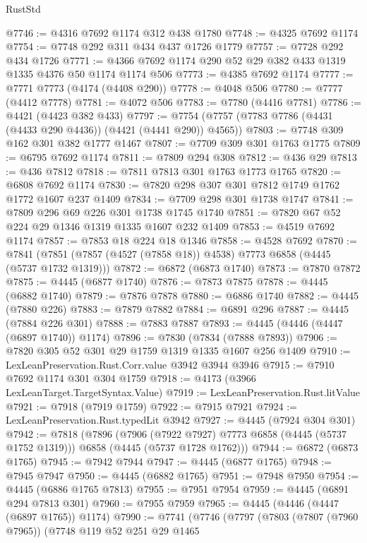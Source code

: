 \begin{lexlean}{RustStd}
\begin{coremodule}
@7746 := @4316 @7692 @1174 @312 @438 @1780
@7748 := @4325 @7692 @1174
@7754 := @7748 @292 @311 @434 @437 @1726 @1779
@7757 := @7728 @292 @434 @1726
@7771 := @4366 @7692 @1174 @290 @52 @29 @382 @433 @1319 @1335 @4376 @50 @1174 @1174 @506
@7773 := @4385 @7692 @1174
@7777 := @7771 @7773 (@4174 (@4408 @290))
@7778 := @4048 @506
@7780 := @7777 (@4412 @7778)
@7781 := @4072 @506
@7783 := @7780 (@4416 @7781)
@7786 := @4421 (@4423 @382 @433)
@7797 := @7754 (@7757 (@7783 @7786 (@4431 (@4433 @290 @4436)) (@4421 (@4441 @290)) @4565))
@7803 := @7748 @309 @162 @301 @382 @1777 @1467
@7807 := @7709 @309 @301 @1763 @1775
@7809 := @6795 @7692 @1174
@7811 := @7809 @294 @308
@7812 := @436 @29
@7813 := @436 @7812
@7818 := @7811 @7813 @301 @1763 @1773 @1765
@7820 := @6808 @7692 @1174
@7830 := @7820 @298 @307 @301 @7812 @1749 @1762 @1772 @1607 @237 @1409
@7834 := @7709 @298 @301 @1738 @1747
@7841 := @7809 @296 @69 @226 @301 @1738 @1745 @1740
@7851 := @7820 @67 @52 @224 @29 @1346 @1319 @1335 @1607 @232 @1409
@7853 := @4519 @7692 @1174
@7857 := @7853 @18 @224 @18 @1346
@7858 := @4528 @7692
@7870 := @7841 (@7851 (@7857 (@4527 (@7858 @18)) @4538) @7773 @6858 (@4445 (@5737 @1732 @1319)))
@7872 := @6872 (@6873 @1740)
@7873 := @7870 @7872
@7875 := @4445 (@6877 @1740)
@7876 := @7873 @7875
@7878 := @4445 (@6882 @1740)
@7879 := @7876 @7878
@7880 := @6886 @1740
@7882 := @4445 (@7880 @226)
@7883 := @7879 @7882
@7884 := @6891 @296
@7887 := @4445 (@7884 @226 @301)
@7888 := @7883 @7887
@7893 := @4445 (@4446 (@4447 (@6897 @1740)) @1174)
@7896 := @7830 (@7834 (@7888 @7893))
@7906 := @7820 @305 @52 @301 @29 @1759 @1319 @1335 @1607 @256 @1409
@7910 := LexLeanPreservation.Rust.Corr.value @3942 @3944 @3946
@7915 := @7910 @7692 @1174 @301 @304 @1759
@7918 := @4173 (@3966 LexLeanTarget.TargetSyntax.Value)
@7919 := LexLeanPreservation.Rust.litValue
@7921 := @7918 (@7919 @1759)
@7922 := @7915 @7921
@7924 := LexLeanPreservation.Rust.typedLit @3942
@7927 := @4445 (@7924 @304 @301)
@7942 := @7818
    (@7896
      (@7906 (@7922 @7927) @7773 @6858 (@4445 (@5737 @1752 @1319)))
      @6858
      (@4445 (@5737 @1728 @1762)))
@7944 := @6872 (@6873 @1765)
@7945 := @7942 @7944
@7947 := @4445 (@6877 @1765)
@7948 := @7945 @7947
@7950 := @4445 (@6882 @1765)
@7951 := @7948 @7950
@7954 := @4445 (@6886 @1765 @7813)
@7955 := @7951 @7954
@7959 := @4445 (@6891 @294 @7813 @301)
@7960 := @7955 @7959
@7965 := @4445 (@4446 (@4447 (@6897 @1765)) @1174)
@7990 := @7741
    (@7746
      (@7797
        (@7803
          (@7807 (@7960 @7965))
          (@7748
            @119
            @52
            @251
            @29
            @1465

\end{coremodule}
\end{lexlean}
